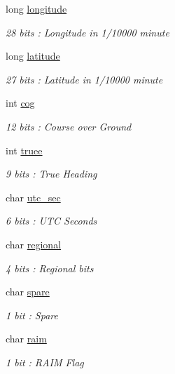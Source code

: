 \begin{DoxyCompactItemize}
long \mbox{\hyperlink{structaismsg__3_ae0d2d6a40b2a4b7afd354141ec4679b4}{longitude}}
\begin{DoxyCompactList}\small\item\em 28 bits \+: Longitude in 1/10000 minute \end{DoxyCompactList}\item 
long \mbox{\hyperlink{structaismsg__3_a6de5fffec4489813545e2f1c83dc4451}{latitude}}
\begin{DoxyCompactList}\small\item\em 27 bits \+: Latitude in 1/10000 minute \end{DoxyCompactList}\item 
int \mbox{\hyperlink{structaismsg__3_a835fa458851b1c28ba11bea80032c962}{cog}}
\begin{DoxyCompactList}\small\item\em 12 bits \+: Course over Ground \end{DoxyCompactList}\item 
int \mbox{\hyperlink{structaismsg__3_a92f36d0118963a397d4a94e53ccf999f}{truee}}
\begin{DoxyCompactList}\small\item\em 9 bits \+: True Heading \end{DoxyCompactList}\item 
char \mbox{\hyperlink{structaismsg__3_a8312635e0041843ce9e2d0e96bcf1cfd}{utc\+\_\+sec}}
\begin{DoxyCompactList}\small\item\em 6 bits \+: U\+TC Seconds \end{DoxyCompactList}\item 
char \mbox{\hyperlink{structaismsg__3_aeb21a8b5b7abe15d32830184ec88e23e}{regional}}
\begin{DoxyCompactList}\small\item\em 4 bits \+: Regional bits \end{DoxyCompactList}\item 
char \mbox{\hyperlink{structaismsg__3_a3802b885b99e4f2c6be5436a74665235}{spare}}
\begin{DoxyCompactList}\small\item\em 1 bit \+: Spare \end{DoxyCompactList}\item 
char \mbox{\hyperlink{structaismsg__3_a6073a0e61236c2334ce06588950c85cd}{raim}}
\begin{DoxyCompactList}\small\item\em 1 bit \+: R\+A\+IM Flag \end{DoxyCompactList}\item 

\end{DoxyCompactItemize}
